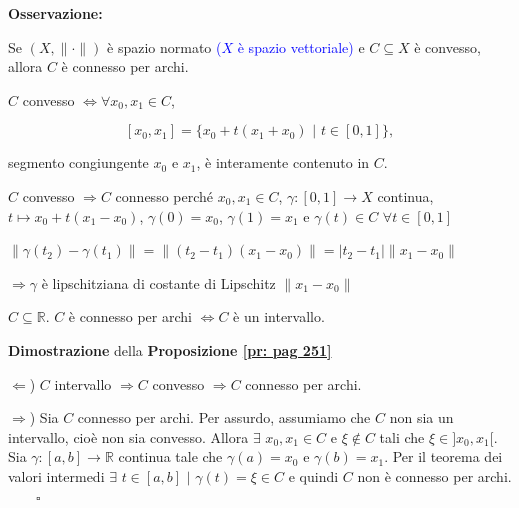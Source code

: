 \textbf{Osservazione:}

Se $(X, \|\cdot\|)$ è spazio normato \textcolor{blue}{($X$ è spazio vettoriale)} e $C \subseteq X$ è convesso, allora $C$ è connesso per archi. 

$C$ convesso $\Leftrightarrow \forall x_0,x_1\in C$, 

$$[x_0,x_1]=\{x_0+t(x_1+x_0)\,\, \big|\,\,t \in [0,1]\},$$

segmento congiungente $x_0$ e $x_1$, è interamente contenuto in $C$. 

$C$ convesso $\Rightarrow C$ connesso perché $x_0, x_1 \in C$, $\gamma:[0,1]\rightarrow X$ continua, $t \mapsto x_0+t(x_1-x_0)$, $\gamma(0)=x_0$, $\gamma(1)=x_1$ e $\gamma(t)\in C$ $\forall t \in [0,1]$ 

{\color{blue}$\|\gamma(t_2)-\gamma(t_1)\|=\|(t_2-t_1)(x_1-x_0)\|=|t_2-t_1|\|x_1-x_0\|$
	
$\Rightarrow \gamma$ è lipschitziana di costante di Lipschitz $\|x_1-x_0\|$}


\begin{proposition}
	\label{pr: pag 251}
	$C \subseteq \mathbb{R}$. $C$ è connesso per archi $\Leftrightarrow C$ è un intervallo.
	
	\segnaposto %
\end{proposition}


\begin{dembar}
	\textbf{Dimostrazione} della \textbf{Proposizione \ref{pr: pag 251}}
	
	$\Leftarrow$) $C$ intervallo $\Rightarrow C$ convesso $\Rightarrow C$ connesso per archi.
	
	$\Rightarrow$) Sia $C$ connesso per archi. Per assurdo, assumiamo che $C$ non sia un intervallo, cioè non sia convesso. Allora $\exists\,\, x_0,x_1 \in C$ e $\xi \notin C$ tali che $\xi \in ]x_0,x_1[$. Sia $\gamma:[a,b]\rightarrow \mathbb{R}$ continua tale che $\gamma(a)=x_0$ e $\gamma(b)=x_1$. Per il teorema dei valori intermedi $\exists\,\, t \in [a,b]\,\, \big|\,\, \gamma(t)=\xi \in C$ e quindi $C$ non è connesso per archi. $\qquad\square$
\end{dembar}


